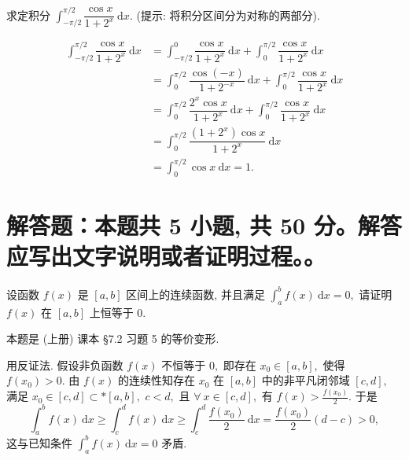 \begin{question}[points = 10]
求定积分 $\displaystyle \int_{-\pi/2}^{\pi/2} \dfrac{\cos x}{1 + 2^x} ~ \mathrm{d}x.$ (提示: 将积分区间分为对称的两部分).

\end{question}

\begin{solution}
\begin{align*}
\int_{-\pi/2}^{\pi/2} \dfrac{\cos x}{1 + 2^x} ~ \mathrm{d}x & = \int_{-\pi/2}^{0} \dfrac{\cos x}{1 + 2^x} ~ \mathrm{d}x + \int_{0}^{\pi/2} \dfrac{\cos x}{1 + 2^x} ~ \mathrm{d}x \\
& = \int_{0}^{\pi/2} \dfrac{\cos (-x)}{1 + 2^{-x}} ~ \mathrm{d}x + \int_{0}^{\pi/2} \dfrac{\cos x}{1 + 2^x} ~ \mathrm{d}x \\
& = \int_{0}^{\pi/2} \dfrac{2^{x} \cos x}{1 + 2^{x}} ~ \mathrm{d}x + \int_{0}^{\pi/2} \dfrac{\cos x}{1 + 2^x} ~ \mathrm{d}x \\
& = \int_{0}^{\pi/2} \dfrac{(1 + 2^{x}) \cos x}{1 + 2^{x}} ~ \mathrm{d}x \\
& = \int_{0}^{\pi/2} \cos x ~ \mathrm{d}x = 1.
\end{align*}
\end{solution}


\showquestionpoints
\section{解答题：本题共 5 小题, 共 50 分。解答应写出文字说明或者证明过程。。}


\begin{question}[points = 8]
设函数 $f(x)$ 是 $[a, b]$ 区间上的连续函数, 并且满足 $\displaystyle \int_a^b f(x) ~ \mathrm{d}x = 0,$ 请证明 $f(x)$ 在 $[a, b]$ 上恒等于 $0.$

\end{question}

\begin{solution}
本题是 (上册) 课本 \S 7.2 习题 5 的等价变形.

用反证法. 假设非负函数 $f(x)$ 不恒等于 $0,$ 即存在 $x_0 \in [a,b],$ 使得 $f(x_0) > 0.$ 由 $f(x)$ 的连续性知存在 $x_0$ 在 $[a, b]$ 中的非平凡闭邻域 $[c, d],$ 满足 $x_0 \in [c, d] \subset* [a, b],$ $c < d,$ 且 $\forall ~ x \in [c, d],$ 有 $f(x) > \frac{f(x_0)}{2}.$ 于是
\begin{equation*}
\int_a^b f(x) ~ \mathrm{d}x \geqslant \int_c^d f(x) ~ \mathrm{d}x \geqslant \int_c^d \frac{f(x_0)}{2} ~ \mathrm{d}x = \frac{f(x_0)}{2}(d - c) > 0,
\end{equation*}
这与已知条件 $\displaystyle \int_a^b f(x) ~ \mathrm{d}x = 0$ 矛盾.
\end{solution}


